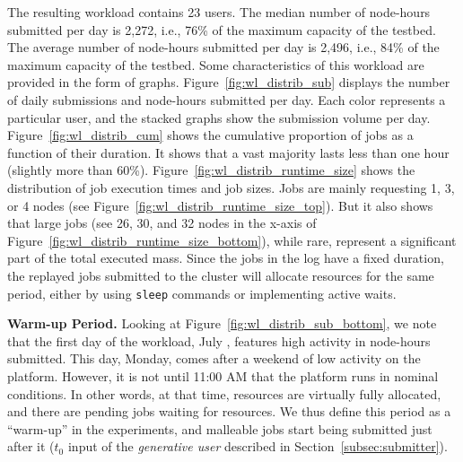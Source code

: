 \documentclass[a4paper,fleqn]{cas-dc}
\begin{document}
The resulting workload contains 23 users.
The median number of node-hours submitted per day is 2,272, i.e., 76\%  of the maximum capacity of the testbed.
The average number of node-hours submitted per day is 2,496, i.e., 84\% of the maximum capacity of the testbed.
Some characteristics of this workload are provided in the form of graphs.
Figure~\ref{fig:wl_distrib_sub} displays the number of daily submissions and node-hours submitted per day. 
Each color represents a particular user, and the stacked graphs show the submission volume per day.
Figure~\ref{fig:wl_distrib_cum} shows the cumulative proportion of jobs as a function of their duration. It shows that a vast majority lasts less than one hour (slightly more than 60\%).
Figure~\ref{fig:wl_distrib_runtime_size} shows the distribution of job execution times and job sizes. 
Jobs are mainly requesting 1, 3, or 4 nodes (see Figure~\ref{fig:wl_distrib_runtime_size_top}). 
But it also shows that large jobs (see 26, 30, and 32 nodes in the x-axis of Figure~\ref{fig:wl_distrib_runtime_size_bottom}), while rare, represent a significant part of the total executed mass.
Since the jobs in the log have a fixed duration, the replayed jobs submitted to the cluster will allocate resources for the same period, either by using \texttt{sleep} commands or implementing active waits.

\textbf{Warm-up Period.}
Looking at Figure~\ref{fig:wl_distrib_sub_bottom}, we note that the first day of the workload, July , features high activity in node-hours submitted.
This day, Monday, comes after a weekend of low activity on the platform. 
However, it is not until 11:00 AM that the platform runs in nominal conditions.
In other words, at that time, resources are virtually fully allocated, and there are pending jobs waiting for resources.
We thus define this period as a ``warm-up'' in the experiments, 
and malleable jobs start being submitted just after it ($t_0$ input of the \textit{generative user} described in Section~\ref{subsec:submitter}).
\end{document}
